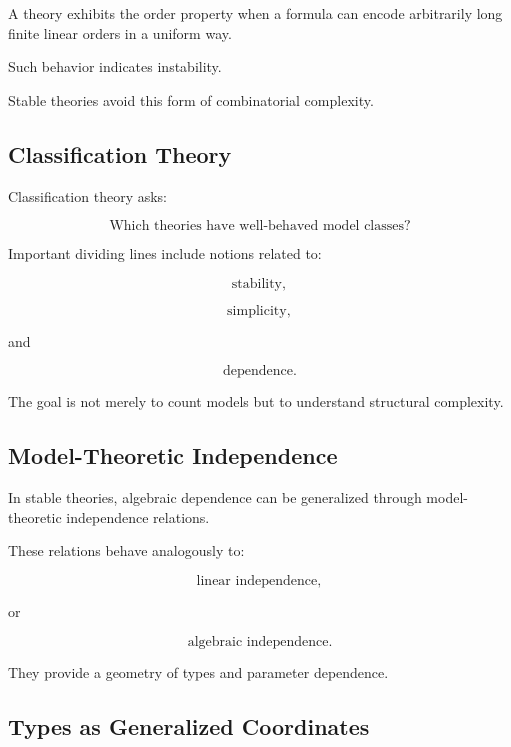 A theory exhibits the order property when a formula can encode arbitrarily
long finite linear orders in a uniform way.

Such behavior indicates instability.

Stable theories avoid this form of combinatorial complexity.

\subsection{Classification Theory}
\label{subsec:model-theoretic-classification-theory}

Classification theory asks:

\[
\boxed{
\text{Which theories have well-behaved model classes?}
}
\]

Important dividing lines include notions related to:

\[
\boxed{
\text{stability},
}
\]

\[
\boxed{
\text{simplicity},
}
\]

and

\[
\boxed{
\text{dependence}.
}
\]

The goal is not merely to count models but to understand structural
complexity.

\subsection{Model-Theoretic Independence}
\label{subsec:model-theoretic-independence}

In stable theories, algebraic dependence can be generalized through
model-theoretic independence relations.

These relations behave analogously to:

\[
\boxed{
\text{linear independence},
}
\]

or

\[
\boxed{
\text{algebraic independence}.
}
\]

They provide a geometry of types and parameter dependence.

\subsection{Types as Generalized Coordinates}
\label{subsec:types-generalized-coordinates}


